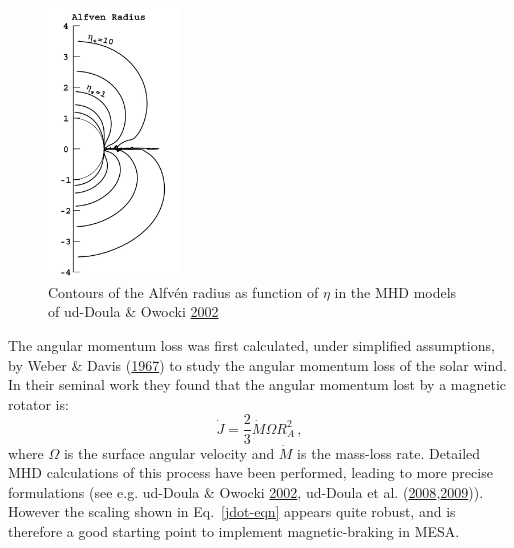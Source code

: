 \documentclass{article}
\begin{document}
\begin{figure}
  \begin{center}
    \includegraphics[width=0.31\textwidth]{uddoula.jpg}
  \end{center}
  \caption{Contours of the Alfv\'en radius as function of $\eta$ in the MHD models of ud-Doula \& Owocki \href{http://adsabs.harvard.edu/abs/2002ApJ...576..413U}{2002}}
\end{figure}




The angular momentum loss was first calculated, under simplified assumptions, by Weber \& Davis (\href{http://adsabs.harvard.edu/abs/1967ApJ...148..217W}{1967}) to 
study the angular momentum loss of the solar wind.
In their seminal work they found that the angular momentum lost by a magnetic rotator is:
\begin{equation}\label{jdot-eqn}
\dot J= \frac {2}{3} \dot M \Omega R_A^2 \, ,
\end{equation}
where $\Omega$ is the surface angular
velocity and  $\dot M$ is the mass-loss rate.
Detailed MHD calculations of this process have been performed, leading to more precise formulations (see e.g. ud-Doula \& Owocki \href{http://adsabs.harvard.edu/abs/2002ApJ...576..413U}{2002}, ud-Doula et al. (\href{http://adsabs.harvard.edu/abs/2008MNRAS.385...97U}{2008},\href{http://adsabs.harvard.edu/abs/2009MNRAS.392.1022U}{2009})).
However the scaling shown in Eq.~\ref{jdot-eqn} appears quite robust, and is therefore a good starting point 
to implement magnetic-braking in MESA.
\end{document}
